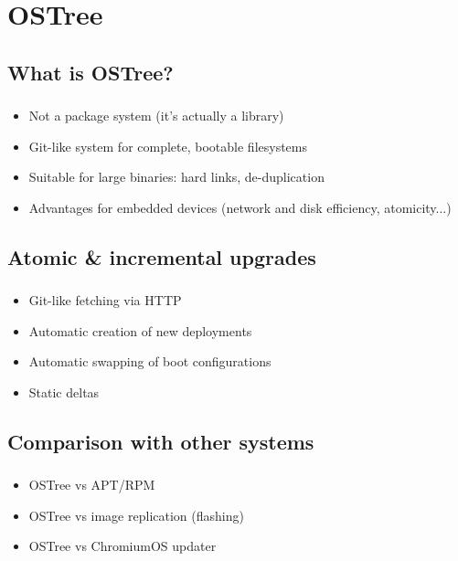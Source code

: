 %
%
%

\section{OSTree}
\subsection{What is OSTree?}

\begin{frame}
  \frametitle{\insertsubsection}

    \begin{itemize}
      \item Not a package system (it's actually a library)\vspacing
      \item Git-like system for complete, bootable filesystems\vspacing
      \item Suitable for large binaries: hard links, de-duplication\vspacing
      \item Advantages for embedded devices (network and disk efficiency, atomicity...)\vspacing
    \end{itemize}
\end{frame}

\subsection{Atomic \& incremental upgrades}
\begin{frame}
  \frametitle{\insertsubsection}

    \begin{itemize}
      \item Git-like fetching via HTTP\vspacing
      \item Automatic creation of new deployments\vspacing
      \item Automatic swapping of boot configurations\vspacing
      \item Static deltas\vspacing
    \end{itemize}
\end{frame}

\subsection{Comparison with other systems}
\begin{frame}
  \frametitle{\insertsubsection}

    \begin{itemize}
      \item OSTree vs APT/RPM\vspacing
      \item OSTree vs image replication (flashing)\vspacing
      \item OSTree vs ChromiumOS updater\vspacing
    \end{itemize}
\end{frame}

